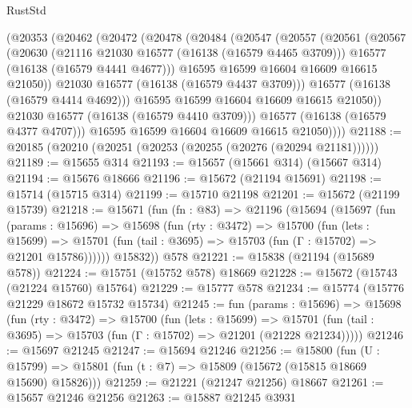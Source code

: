 \begin{lexlean}{RustStd}
\begin{coremodule}
          (@20353
            (@20462
              (@20472
                (@20478
                  (@20484
                    (@20547
                      (@20557
                        (@20561
                          (@20567
                            (@20630
                              (@21116 @21030 @16577 (@16138 (@16579 @4465 @3709)))
                              @16577
                              (@16138 (@16579 @4441 @4677)))
                            @16595
                            @16599
                            @16604
                            @16609
                            @16615
                            @21050))
                        @21030
                        @16577
                        (@16138 (@16579 @4437 @3709)))
                      @16577
                      (@16138 (@16579 @4414 @4692)))
                    @16595
                    @16599
                    @16604
                    @16609
                    @16615
                    @21050))
                @21030
                @16577
                (@16138 (@16579 @4410 @3709)))
              @16577
              (@16138 (@16579 @4377 @4707)))
            @16595
            @16599
            @16604
            @16609
            @16615
            @21050))))
@21188 := @20185 (@20210 (@20251 (@20253 (@20255 (@20276 (@20294 @21181))))))
@21189 := @15655 @314
@21193 := @15657 (@15661 @314) (@15667 @314)
@21194 := @15676 @18666
@21196 := @15672 (@21194 @15691)
@21198 := @15714 (@15715 @314)
@21199 := @15710 @21198
@21201 := @15672 (@21199 @15739)
@21218 := @15671
    (fun (fn : @83) =>
    @21196
      (@15694
        (@15697
          (fun (params : @15696) =>
          @15698
            (fun (rty : @3472) =>
            @15700
              (fun (lets : @15699) =>
              @15701 (fun (tail : @3695) => @15703 (fun (Γ : @15702) => @21201 @15786))))))
        @15832))
    @578
@21221 := @15838 (@21194 (@15689 @578))
@21224 := @15751 (@15752 @578) @18669
@21228 := @15672 (@15743 (@21224 @15760) @15764)
@21229 := @15777 @578
@21234 := @15774 (@15776 @21229 @18672 @15732 @15734)
@21245 := fun (params : @15696) =>
  @15698
    (fun (rty : @3472) =>
    @15700
      (fun (lets : @15699) =>
      @15701 (fun (tail : @3695) => @15703 (fun (Γ : @15702) => @21201 (@21228 @21234)))))
@21246 := @15697 @21245
@21247 := @15694 @21246
@21256 := @15800
    (fun (U : @15799) => @15801 (fun (t : @7) => @15809 (@15672 (@15815 @18669 @15690) @15826)))
@21259 := @21221 (@21247 @21256) @18667
@21261 := @15657 @21246 @21256
@21263 := @15887 @21245 @3931

\end{coremodule}
\end{lexlean}
